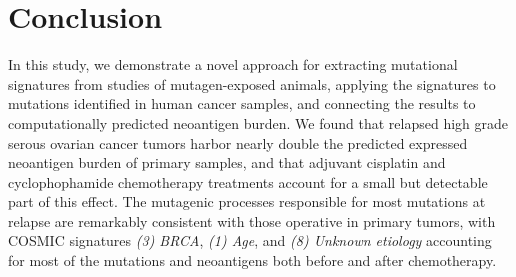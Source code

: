 \section*{Conclusion}
In this study, we demonstrate a novel approach for extracting mutational signatures from studies of mutagen-exposed animals, applying the signatures to mutations identified in human cancer samples, and connecting the results to computationally predicted neoantigen burden. We found that relapsed high grade serous ovarian cancer tumors harbor nearly double the predicted expressed neoantigen burden of primary samples, and that adjuvant cisplatin and cyclophophamide chemotherapy treatments account for a small but detectable part of this effect. The mutagenic processes responsible for most mutations at relapse are remarkably consistent with those operative in primary tumors, with COSMIC signatures \textit{(3) BRCA}, \textit{(1) Age}, and \textit{(8) Unknown etiology} accounting for most of the mutations and neoantigens both before and after chemotherapy.